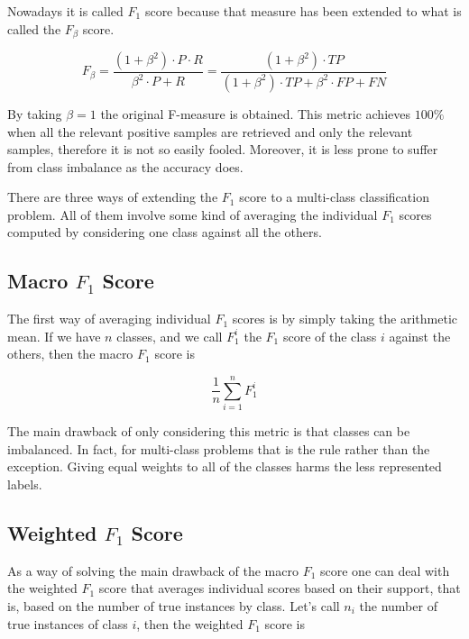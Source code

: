 Nowadays it is called $F_1$ score because that measure has been extended to what is called the $F_\beta$ score.

\begin{equation}
    F_\beta = \frac{(1+\beta^2) \cdot P \cdot R}{\beta^2 \cdot P + R} = \frac{(1+\beta^2) \cdot TP}{(1+\beta^2) \cdot TP + \beta^2 \cdot FP + FN}
\end{equation}

\noindent By taking $\beta=1$ the original F-measure is obtained. This metric achieves $100\%$ when all the relevant positive samples are retrieved and only the relevant samples, therefore it is not so easily fooled. Moreover, it is less prone to suffer from class imbalance as the accuracy does.

There are three ways of extending the $F_1$ score to a multi-class classification problem. All of them involve some kind of averaging the individual $F_1$ scores computed by considering one class against all the others. 

\subsection{Macro $F_1$ Score}

The first way of averaging individual $F_1$ scores is by simply taking the arithmetic mean. If we have $n$ classes, and we call $F_1^i$ the $F_1$ score of the class $i$ against the others, then the macro $F_1$ score is

\begin{equation}
    \frac{1}{n} \sum_{i=1}^n F_1^i
\end{equation}

The main drawback of only considering this metric is that classes can be imbalanced. In fact, for multi-class problems that is the rule rather than the exception. Giving equal weights to all of the classes harms the less represented labels.

\subsection{Weighted $F_1$ Score}

As a way of solving the main drawback of the macro $F_1$ score one can deal with the weighted $F_1$ score that averages individual scores based on their support, that is, based on the number of true instances by class. Let's call $n_i$ the number of true instances of class $i$, then the weighted $F_1$ score is

